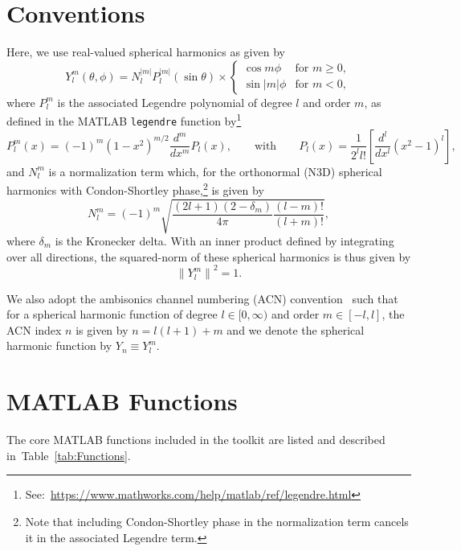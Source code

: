 \documentclass[11pt, oneside]{article}
\newcommand{\tabref}[1]{Table~\ref{#1}}
\begin{document}
\section{Conventions}\label{sec:Conventions}
Here, we use real-valued spherical harmonics as given by~\citet[section~2.2]{Zotter2009PhD}
\begin{equation*}
Y_l^m(\theta,\phi) = N_l^{|m|} P_l^{|m|} (\sin \theta) \times \left\{
    \begin{array}{cl}
	\cos m \phi & \textrm{for } m \geq 0,\\[8pt]
	\sin |m| \phi & \textrm{for } m < 0,
    \end{array}\right.
\end{equation*}
where $P_l^m$ is the associated Legendre polynomial of degree $l$ and order $m$,
as defined in the MATLAB \texttt{legendre} function by\footnote{See:~\url{https://www.mathworks.com/help/matlab/ref/legendre.html}}
\begin{equation*}
P_l^m(x) = (-1)^m (1 - x^2)^{m/2} \frac{d^m}{dx^m} P_l(x), 
\quad\quad \textrm{with} \quad\quad
P_l(x) = \frac{1}{2^l l!} \left[ \frac{d^l}{dx^l}(x^2 - 1)^l \right],
\end{equation*}
and $N_l^m$ is a normalization term which, for the orthonormal (N3D)
spherical harmonics with Condon-Shortley phase,\footnote{Note that including
Condon-Shortley phase in the normalization term cancels it in the associated Legendre term.}
is given by~\citep{Nachbar2011}
\begin{equation*}
N_l^m = (-1)^m \sqrt{\frac{(2l+1)(2 - \delta_m)}{4 \pi} \frac{(l-m)!}{(l+m)!}},
\end{equation*}
where $\delta_m$ is the Kronecker delta.
With an inner product defined by integrating over all directions, the squared-norm of these spherical harmonics is thus given by
\begin{equation*}
\left\| Y_l^m \right\|^2 = 1.
\end{equation*}

We also adopt the ambisonics channel numbering (ACN) convention~\citep{Nachbar2011}
such that for a spherical harmonic function of degree $l \in [0,\infty)$ and order $m \in [-l,l]$,
the ACN index $n$ is given by $n = l (l + 1) + m$ and we denote the spherical harmonic function by $Y_n \equiv Y_l^m$.

\section{MATLAB Functions}\label{sec:Functions}
The core MATLAB functions included in the toolkit are listed and described in~\tabref{tab:Functions}.
\end{document}
